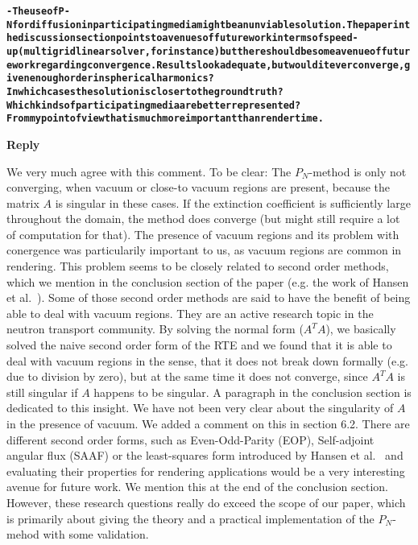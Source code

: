 \documentclass[11pt,letterpaper,headsepline,DIV15]{scrartcl}
\def\bf{\normalfont\bfseries}
\newcounter{rplcounter}
\renewcommand{\therplcounter}{\arabic{rplcounter}}
\newenvironment{reply}[2]{%
\refstepcounter{rplcounter}%
\label{#1}%
\noindent\textbf{\textcolor{answerColor}{Reply~\therplcounter}\\}%
\color{answerColor}
}%
{}%
\newcommand{\tocomment}[1]{\bf#1}
\begin{document}
{\scriptsize\begin{alltt}
\tocomment{
- The use of P-N for diffusion in participating media might be an unviable solution. The paper in the discussion section points to avenues of future work in terms of speed-up (multigrid linear solver, for instance) but there should be some avenue of future work regarding convergence. Results look adequate, but would it ever converge, given enough order in spherical harmonics? In which cases the solution is closer to the ground truth? Which kinds of participating media are better represented? From my point of view that is much more important than render time.}
\end{alltt}}

\begin{reply}{}{}
\label{rpl:gg}
We very much agree with this comment. To be clear: The $P_N$-method is only not converging, when vacuum or close-to vacuum regions are present, because the matrix $A$ is singular in these cases. If the extinction coefficient is sufficiently large throughout the domain, the method does converge (but might still require a lot of computation for that).
\newline
\newline
The presence of vacuum regions and its problem with conergence was particularily important to us, as vacuum regions are common in rendering. This problem seems to be closely related to second order methods, which we mention in the conclusion section of the paper (e.g. the work of Hansen et al.~\cite{Hansen14}). Some of those second order methods are said to have the benefit of being able to deal with vacuum regions. They are an active research topic in the neutron transport community. By solving the normal form ($A^TA$), we basically solved the naive second order form of the RTE and we found that it is able to deal with vacuum regions in the sense, that it does not break down formally (e.g. due to division by zero), but at the same time it does not converge, since $A^TA$ is still singular if $A$ happens to be singular. A paragraph in the conclusion section is dedicated to this insight.
\newline
\newline
We have not been very clear about the singularity of $A$ in the presence of vacuum. We added a comment on this in section 6.2.
\newline
\newline
There are different second order forms, such as Even-Odd-Parity (EOP), Self-adjoint angular flux (SAAF) or the least-squares form introduced by Hansen et al.~\cite{Hansen14} and evaluating their properties for rendering applications would be a very interesting avenue for future work. We mention this at the end of the conclusion section. However, these research questions really do exceed the scope of our paper, which is primarily about giving the theory and a practical implementation of the $P_N$-mehod with some validation.
\end{reply}
\end{document}
